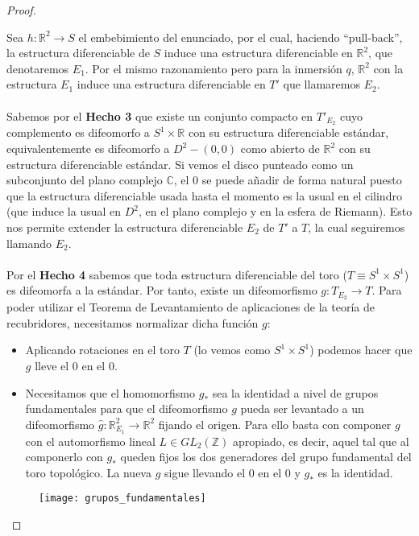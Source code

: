 \begin{proof}
\begin{enumerate}
			Sea $h:\mathbb{R}^2 \rightarrow S$ el embebimiento del enunciado, por el cual, haciendo ``pull-back'', la estructura diferenciable de $S$ induce una estructura diferenciable en $\mathbb{R}^2$, que denotaremos $E_1$. Por el mismo razonamiento pero para la inmersión $q$, $\mathbb{R}^2$ con la estructura $E_1$ induce una estructura diferenciable en $T'$ que llamaremos $E_2$.\\
			\\ Sabemos por el \textbf{Hecho 3} que existe un conjunto compacto en $T'_{E_2}$ cuyo complemento es difeomorfo a $S^1\times \mathbb{R}$ con su estructura diferenciable estándar, equivalentemente es difeomorfo a $D^2 - {(0,0)}$ como abierto de $\mathbb{R}^2$ con su estructura diferenciable estándar. Si vemos el disco punteado como un subconjunto del plano complejo $\mathbb{C}$, el $0$ se puede añadir de forma natural puesto que la estructura diferenciable usada hasta el momento es la usual en el cilindro (que induce la usual en $D^2$, en el plano complejo y en la esfera de Riemann). Esto nos permite extender la estructura diferenciable $E_2$ de $T'$ a $T$, la cual seguiremos llamando $E_2$.\\
			\\ Por el \textbf{Hecho 4} sabemos que toda estructura diferenciable del toro ($T \equiv S^1\times S^1$) es difeomorfa a la estándar. Por tanto, existe un difeomorfismo $g: T_{E_2} \rightarrow T$. Para poder utilizar el Teorema de Levantamiento de aplicaciones de la teoría de recubridores, necesitamos normalizar dicha función $g$:
						
			\begin{itemize}
				\item Aplicando rotaciones en el toro $T$ (lo vemos como $S^1\times S^1$) podemos hacer que $g$ lleve el $0$ en el $0$.
				\item Necesitamos que el homomorfismo $g_*$ sea la identidad a nivel de grupos fundamentales para que el difeomorfismo $g$ pueda ser levantado a un difeomorfismo $\widehat{g} : \mathbb{R}^2_{E_1} \rightarrow \mathbb{R}^2$ fijando el origen. Para ello basta con componer $g$ con el automorfismo lineal $L \in GL_2(\mathbb{Z})$ apropiado, es decir, aquel tal que al componerlo con $g_*$ queden fijos los dos generadores del grupo fundamental del toro topológico. La nueva $g$ sigue llevando el $0$ en el $0$ y $g_*$ es la identidad.\\
			\end{itemize}
			
			\begin{figure}[h]
  				\centering
  				\texttt{[image: grupos\_fundamentales]}
  				\label{fig:fundamental}
			\end{figure}
			 

\end{enumerate}
\end{proof}
